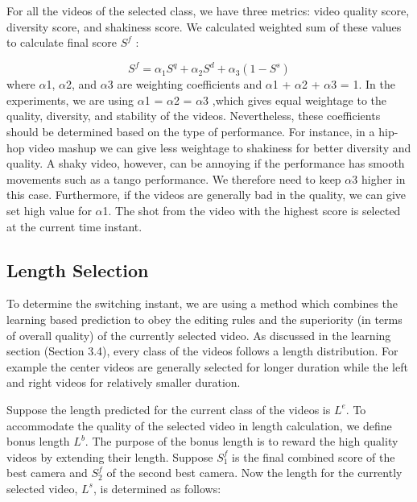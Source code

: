 \documentclass{sig-alternate}
\begin{document}
For all the videos of the selected class, we have three metrics:
video quality score, diversity score, and shakiness score. We calculated weighted sum of these values to calculate final score $S^f$ :

\begin{equation}
    S^f = \alpha_1S^q + \alpha_2S^d + \alpha_3(1 - S^s)
\end{equation}
where $\alpha$1, $\alpha$2, and $\alpha$3 are weighting coefficients and $\alpha$1 + $\alpha$2 + $\alpha$3 = 1. In the experiments, we are using $\alpha$1 = $\alpha$2 = $\alpha$3 ,which gives equal weightage to the quality, diversity, and stability of the videos. Nevertheless, these coefficients should be determined based on the type of performance. For instance, in a hip-hop video mashup we can give less weightage to shakiness for better diversity and quality. A shaky video, however, can be annoying if the performance has smooth movements such as a tango performance.
We therefore need to keep $\alpha$3 higher in this case. Furthermore, if
the videos are generally bad in the quality, we can give set high
value for $\alpha$1. The shot from the video with the highest score is
selected at the current time instant.

\subsection{Length Selection}

To determine the switching instant, we are using a method which
combines the learning based prediction to obey the editing rules and
the superiority (in terms of overall quality) of the currently selected
video. As discussed in the learning section (Section 3.4), every
class of the videos follows a length distribution. For example the
center videos are generally selected for longer duration while the
left and right videos for relatively smaller duration.

Suppose the length predicted for the current class of the videos
is $L^e$. To accommodate the quality of the selected video in length
calculation, we define bonus length $L^b$. The purpose of the bonus
length is to reward the high quality videos by extending their length.
Suppose $S^f_1$ is the final combined score of the best camera and $S^f_2$
of the second best camera. Now the length for the currently selected
video, $L^s$, is determined as follows:
\end{document}
